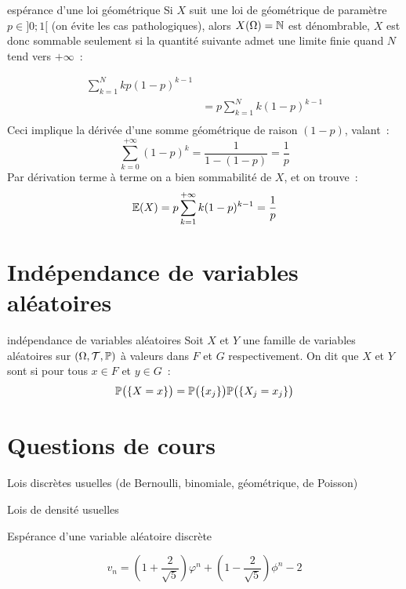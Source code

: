\begin{exemple}{}{espérance d'une loi géométrique}
    Si $X$ suit une loi de géométrique de paramètre $p \in ]0; 1[$ (on évite les cas pathologiques), alors $X(\Omega) = \mathbb{N}$ est dénombrable, $X$ est donc sommable seulement si la quantité suivante admet une limite finie quand $N$ tend vers $+\infty$~:

    \begin{align*}
        \sum_{k=1}^N k p (1-p)^{k-1}\\
        &= p \sum_{k=1}^N k (1-p)^{k-1}\\
    \end{align*}
    Ceci implique la dérivée d'une somme    géométrique de raison $(1-p)$, valant~:
    $$\sum_{k=0}^{+\infty} (1-p)^k = \frac{1}{1-(1-p)} = \frac{1}{p}$$
    Par dérivation terme à terme on a bien sommabilité de $X$, et on trouve~:
    $$\mathbb{E}(X) = p\sum_{k=1}^{+\infty} k (1-p)^{k-1} = \frac{1}{p}$$
\end{exemple}




\section{Indépendance de variables aléatoires}

\begin{definition}{}{indépendance de variables aléatoires}
    Soit $X$ et $Y$ une famille de variables aléatoires sur $(\Omega, \mathcal{T}, \mathbb{P})$ à valeurs dans $F$ et $G$ respectivement. On dit que $X$ et $Y$ sont  si pour tous $x \in F$ et $y \in G$~:
    $$\mathbb{P}\big(\{X = x\}\big) = \mathbb{P}\big(\{x_j\}\big)\mathbb{P}\big(\{X_j = x_j\}\big)$$
    
\end{definition}


\section*{Questions de cours}

\begin{enumeratebf}
    \item Lois discrètes usuelles (de Bernoulli, binomiale, géométrique, de Poisson)
    \item Lois de densité usuelles 
    \item Espérance d'une variable aléatoire discrète
\end{enumeratebf}

$$v_n = \left( 1 + \frac{2}{\sqrt{5}}\right)\varphi^n+ \left( 1 - \frac{2}{\sqrt{5}}\right) \phi^n - 2$$

